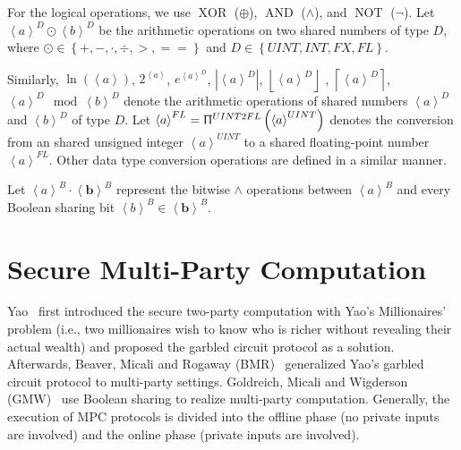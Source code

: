 For the logical operations, we use $\operatorname{XOR}$ ($\oplus $), $\operatorname{AND}$ ($\land $), and $\operatorname{NOT}$ ($\neg$).
Let $\left\langle {a}\right\rangle^{D} \odot \left\langle {b}\right\rangle^{D}$ be the arithmetic operations on two shared numbers of type $D$, where $\odot\in\left\{+, -, \cdot, \div, >, ==\right\} $ and $D\in \left\{UINT, INT, FX, FL\right\} $.

Similarly, $\ln\left(\left\langle {a}\right\rangle \right) $, $2^{\left\langle {a}\right\rangle } $, $e^{\left\langle {a}\right\rangle^{D} }$, $\left\lvert \left\langle {a}\right\rangle^{D} \right\rvert $, $\left\lfloor \left\langle {a}\right\rangle^{D} \right\rfloor $ , $\left\lceil \left\langle {a}\right\rangle^{D} \right\rceil $, $\left\langle {a}\right\rangle^{D} \mod \left\langle {b}\right\rangle^{D} $ denote the arithmetic operations of shared numbers $\left\langle {a}\right\rangle^{D} $ and $\left\langle {b}\right\rangle^{D} $ of type $D$.
Let $\left\langle {a}\right\rangle ^{FL}=\Uppi^{UINT2FL}\left(\left\langle {a}\right\rangle ^{UINT}\right) $ denotes the conversion from an shared unsigned integer $\left\langle {a}\right\rangle ^{UINT}$ to a shared floating-point number $\left\langle {a}\right\rangle ^{FL}$. Other data type conversion operations are defined in a similar manner.

Let $\left\langle a\right\rangle ^B \cdot \left\langle \boldsymbol{b}\right\rangle ^{B}$ represent the bitwise $\land$ operations between $\left\langle a\right\rangle ^B$ and every Boolean sharing bit $\left\langle b\right\rangle^B \in\left\langle \boldsymbol{b}\right\rangle ^{B}$.



\section{Secure Multi-Party Computation}
\label{sec:secureMultipartyComputation}
Yao~\cite{Yao86} first introduced the secure two-party computation with Yao's Millionaires' problem (i.e., two millionaires wish to know who is richer without revealing their actual wealth) and proposed the garbled circuit protocol as a solution.
Afterwards, Beaver, Micali and Rogaway (BMR)~\cite{beaver1990round} generalized Yao's garbled circuit protocol to multi-party settings. Goldreich, Micali and Wigderson (GMW)~\cite{goldwasser1987play} use Boolean sharing to realize multi-party computation.
Generally, the execution of MPC protocols is divided into the offline phase (no private inputs are involved) and the online phase (private inputs are involved).

